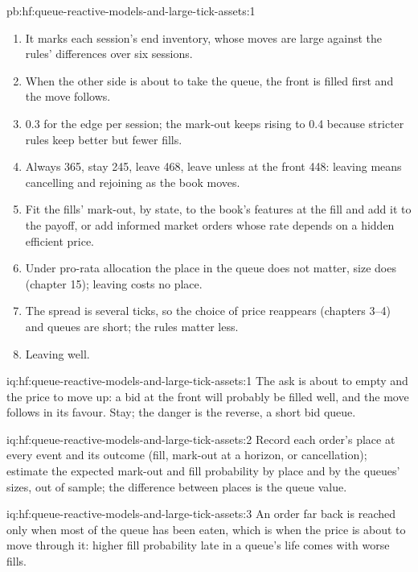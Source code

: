 \begin{solution}{pb:hf:queue-reactive-models-and-large-tick-assets:1}
\begin{enumerate}
a two-lot ask is worth 0.60 ticks and the back 0.32.
\item It marks each session's end inventory, whose moves are large against the rules' differences over six sessions.
\item When the other side is about to take the queue, the front is filled first and the move follows.
\item 0.3 for the edge per session; the mark-out keeps rising to 0.4 because stricter rules keep better but fewer fills.
\item Always 365, stay 245, leave 468, leave unless at the front 448: leaving means cancelling and rejoining as the book moves.
\item Fit the fills' mark-out, by state, to the book's features at the fill and add it to the payoff, or add informed market orders whose rate
depends on a hidden efficient price.
\item Under pro-rata allocation the place in the queue does not matter, size does (chapter 15); leaving costs no place.
\item The spread is several ticks, so the choice of price reappears (chapters 3--4) and queues are short; the rules matter less.
\item Leaving well.
\end{enumerate}
\end{solution}

\begin{solution}{iq:hf:queue-reactive-models-and-large-tick-assets:1}
The ask is about to empty and the price to move up: a bid at the front will probably be filled well, and the move follows in its favour. Stay; the
danger is the reverse, a short bid queue.
\end{solution}

\begin{solution}{iq:hf:queue-reactive-models-and-large-tick-assets:2}
Record each order's place at every event and its outcome (fill, mark-out at a horizon, or cancellation); estimate the expected mark-out and fill
probability by place and by the queues' sizes, out of sample; the difference between places is the queue value.
\end{solution}

\begin{solution}{iq:hf:queue-reactive-models-and-large-tick-assets:3}
An order far back is reached only when most of the queue has been eaten, which is when the price is about to move through it: higher fill
probability late in a queue's life comes with worse fills.
\end{solution}

